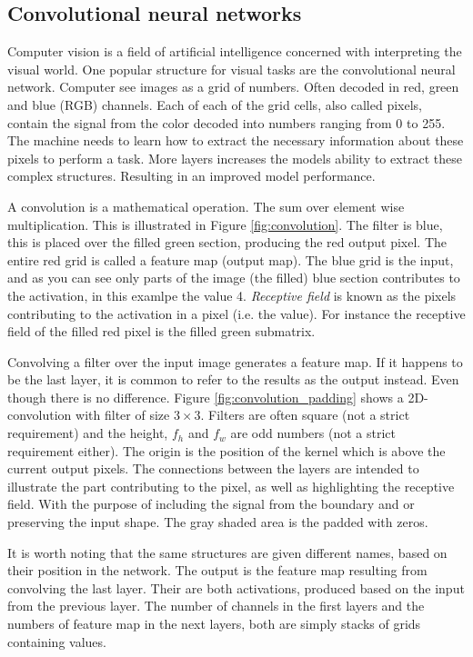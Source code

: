 \documentclass{article}
\begin{document}
\subsection{Convolutional neural networks} \label{sec:convolutional neural network}
Computer vision is a field of artificial intelligence concerned with interpreting the visual world. One popular structure for visual tasks are the convolutional neural network. %
Computer see images as a grid of numbers. Often decoded in red, green and blue (RGB) channels. Each of each of the grid cells, also called pixels, contain the signal from the color decoded into numbers ranging from 0 to 255. The machine needs to learn how to extract the necessary information about these pixels to perform a task. More layers increases the models ability to extract these complex structures. Resulting in an improved model performance. 

A convolution is a mathematical operation. The sum over element wise multiplication. This is illustrated in Figure \ref{fig:convolution}. The filter is blue, this is placed over the filled green section, producing the red output pixel. The entire red grid is called a feature map (output map). The blue grid is the input, and as you can see only parts of the image (the filled) blue section contributes to the activation, in this examlpe the value 4. \textit{Receptive field} is known as the pixels contributing to the activation in a pixel (i.e. the value). For instance the receptive field of the filled red pixel is the filled green submatrix.


Convolving a filter over the input image generates a feature map. If it happens to be the last layer, it is common to refer to the results as the output instead. Even though there is no difference. Figure \ref{fig:convolution_padding} shows a 2D-convolution with filter of size $3\times 3$. Filters are often square (not a strict requirement) and the height, $f_h$ and $f_w$ are odd numbers (not a strict requirement either). The origin is the position of the kernel which is above the current output pixels. The connections between the layers are intended to illustrate the part contributing to the pixel, as well as highlighting the receptive field. With the purpose of including the signal from the boundary and or preserving the input shape. The gray shaded area is the padded with zeros. 

It is worth noting that the same structures are given different names, based on their position in the network. The output is the feature map resulting from convolving the last layer. Their are both activations, produced based on the input from the previous layer. The number of channels in the first layers and the numbers of feature map in the next layers, both are simply stacks of grids containing values.
\end{document}
